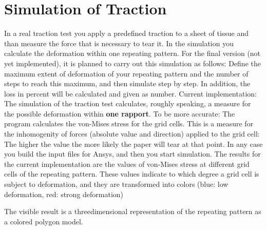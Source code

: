 \section{Simulation of Traction}

In a real traction test you apply a predefined traction to a sheet of tissue and than 
measure the force that is necessary to tear it. In the simulation 
you calculate the deformation within one repeating pattern.\newline 
\newline
For the final version (not yet implemented), it
is planned to carry out this simulation as follows: Define the maximum extent of deformation of your
repeating pattern and the number of steps to reach this maximum, and then simulate step
by step. In addition, the loss in percent will be calculated and given as number.\newline
\newline
Current implementation: The simulation of the traction test calculates, roughly
speaking, a measure for the possible deformation within {\bf one rapport}.
To be more accurate: The program calculates the von-Mises stress for the
grid cells. This is a measure for the inhomogenity of forces (absolute value and
direction) applied to the grid cell: The
higher the value the more likely the paper will tear at that point.\newline
\newline
In any case you build the input files for Ansys, and then 
you start simulation. The results for the current implementation are the values of von-Mises stress at different
grid cells of the repeating pattern. These values indicate to which degree a grid
cell is subject to deformation, and they are transformed into colors (blue: low deformation, 
red: strong deformation)\newline


The visible result is a threedimensional representation of the repeating 
pattern as a colored polygon model.

